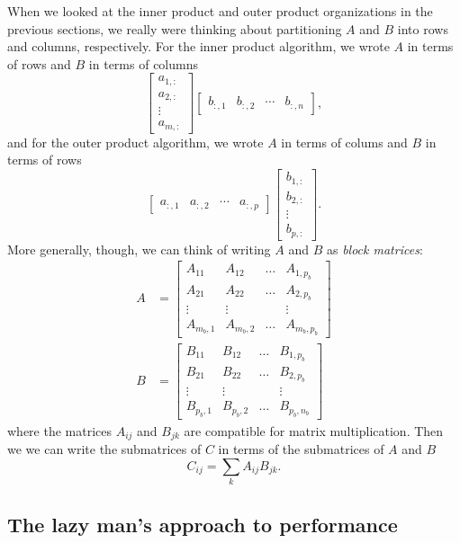 \documentclass[12pt, leqno]{article}
\begin{document}
When we looked at the inner product and outer product organizations
in the previous sections, we really were thinking about partitioning
$A$ and $B$ into rows and columns, respectively.  For the inner product
algorithm, we wrote $A$ in terms of rows and $B$ in terms of columns
\[
  \begin{bmatrix} a_{1,:} \\ a_{2,:} \\ \vdots \\ a_{m,:} \end{bmatrix}
  \begin{bmatrix} b_{:,1} & b_{:,2} & \cdots & b_{:,n} \end{bmatrix},
\]
and for the outer product algorithm, we wrote $A$ in terms of colums
and $B$ in terms of rows
\[
  \begin{bmatrix} a_{:,1} & a_{:,2} & \cdots & a_{:,p} \end{bmatrix}
  \begin{bmatrix} b_{1,:} \\ b_{2,:} \\ \vdots \\ b_{p,:} \end{bmatrix}.
\]
More generally, though, we can think of writing $A$ and $B$ as
{\em block matrices}:
\begin{align*}
  A &=
  \begin{bmatrix}
    A_{11} & A_{12} & \ldots & A_{1,p_b} \\
    A_{21} & A_{22} & \ldots & A_{2,p_b} \\
    \vdots & \vdots &       & \vdots \\
    A_{m_b,1} & A_{m_b,2} & \ldots & A_{m_b,p_b}
  \end{bmatrix} \\
  B &=
  \begin{bmatrix}
    B_{11} & B_{12} & \ldots & B_{1,p_b} \\
    B_{21} & B_{22} & \ldots & B_{2,p_b} \\
    \vdots & \vdots &       & \vdots \\
    B_{p_b,1} & B_{p_b,2} & \ldots & B_{p_b,n_b}
  \end{bmatrix}
\end{align*}
where the matrices $A_{ij}$ and $B_{jk}$ are compatible for matrix
multiplication.  Then we we can write the submatrices of $C$ in terms
of the submatrices of $A$ and $B$
\[
  C_{ij} = \sum_k A_{ij} B_{jk}.
\]

\subsection{The lazy man's approach to performance}
\end{document}
